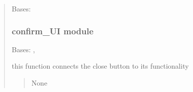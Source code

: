 \documentclass[letterpaper,10pt,english]{sphinxmanual}
\begin{document}
\begin{quote}
\begin{savenotes}\begin{fulllineitems}
\label{\detokenize{setting/app_settings:oxin.app_settings.Settings}}
\pysigstartsignatures
{}
\pysigstopsignatures
\sphinxAtStartPar
Bases: 

\end{fulllineitems}\end{savenotes}


\sphinxstepscope


\subsubsection{confirm\_UI module}
\label{\detokenize{setting/confirm_UI:module-oxin.confirm_UI}}\label{\detokenize{setting/confirm_UI:confirm-ui-module}}\label{\detokenize{setting/confirm_UI::doc}}

\begin{savenotes}\begin{fulllineitems}
\label{\detokenize{setting/confirm_UI:oxin.confirm_UI.UI_main_window}}
\pysigstartsignatures
{}
\pysigstopsignatures
\sphinxAtStartPar
Bases: , 

\begin{savenotes}\begin{fulllineitems}
\label{\detokenize{setting/confirm_UI:oxin.confirm_UI.UI_main_window.activate_}}
\pysigstartsignatures
{}
\pysigstopsignatures
\sphinxAtStartPar
this function connects the close button to its functionality
\begin{quote}\begin{description}
\sphinxAtStartPar
None


\end{description}
\end{quote}
\end{fulllineitems}
\end{savenotes}
\end{fulllineitems}
\end{savenotes}
\end{quote}
\end{document}
